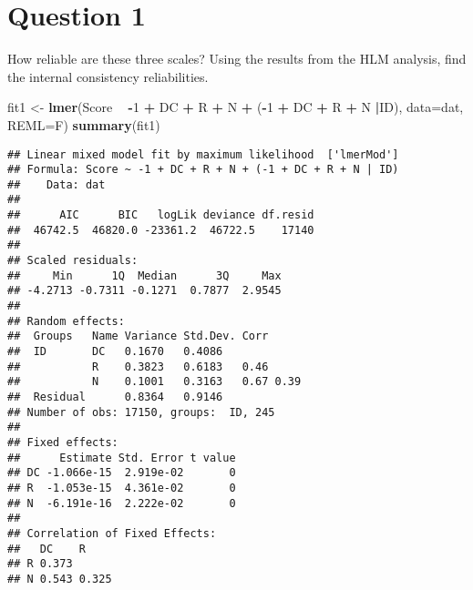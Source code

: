 \documentclass[]{article}
\newenvironment{Shaded}{\begin{snugshade}}{\end{snugshade}}
\newcommand{\KeywordTok}[1]{\textcolor[rgb]{0.13,0.29,0.53}{\textbf{#1}}}
\newcommand{\DataTypeTok}[1]{\textcolor[rgb]{0.13,0.29,0.53}{#1}}
\newcommand{\DecValTok}[1]{\textcolor[rgb]{0.00,0.00,0.81}{#1}}
\newcommand{\StringTok}[1]{\textcolor[rgb]{0.31,0.60,0.02}{#1}}
\newcommand{\OperatorTok}[1]{\textcolor[rgb]{0.81,0.36,0.00}{\textbf{#1}}}
\newcommand{\NormalTok}[1]{#1}
\begin{document}
\section{Question 1}\label{question-1}

How reliable are these three scales? Using the results from the HLM
analysis, find the internal consistency reliabilities.

\begin{Shaded}
\begin{Highlighting}[]
\NormalTok{fit1 <-}\StringTok{ }\KeywordTok{lmer}\NormalTok{(Score }\OperatorTok{~}\StringTok{ }\OperatorTok{-}\DecValTok{1} \OperatorTok{+}\StringTok{ }\NormalTok{DC }\OperatorTok{+}\StringTok{ }\NormalTok{R }\OperatorTok{+}\StringTok{ }\NormalTok{N }\OperatorTok{+}\StringTok{ }
\StringTok{                 }\NormalTok{(}\OperatorTok{-}\DecValTok{1} \OperatorTok{+}\StringTok{ }\NormalTok{DC }\OperatorTok{+}\StringTok{ }\NormalTok{R }\OperatorTok{+}\StringTok{ }\NormalTok{N }\OperatorTok{|}\NormalTok{ID), }\DataTypeTok{data=}\NormalTok{dat,}
                 \DataTypeTok{REML=}\NormalTok{F)}
\KeywordTok{summary}\NormalTok{(fit1)}
\end{Highlighting}
\end{Shaded}

\begin{verbatim}
## Linear mixed model fit by maximum likelihood  ['lmerMod']
## Formula: Score ~ -1 + DC + R + N + (-1 + DC + R + N | ID)
##    Data: dat
## 
##      AIC      BIC   logLik deviance df.resid 
##  46742.5  46820.0 -23361.2  46722.5    17140 
## 
## Scaled residuals: 
##     Min      1Q  Median      3Q     Max 
## -4.2713 -0.7311 -0.1271  0.7877  2.9545 
## 
## Random effects:
##  Groups   Name Variance Std.Dev. Corr     
##  ID       DC   0.1670   0.4086            
##           R    0.3823   0.6183   0.46     
##           N    0.1001   0.3163   0.67 0.39
##  Residual      0.8364   0.9146            
## Number of obs: 17150, groups:  ID, 245
## 
## Fixed effects:
##      Estimate Std. Error t value
## DC -1.066e-15  2.919e-02       0
## R  -1.053e-15  4.361e-02       0
## N  -6.191e-16  2.222e-02       0
## 
## Correlation of Fixed Effects:
##   DC    R    
## R 0.373      
## N 0.543 0.325
\end{verbatim}
\end{document}
